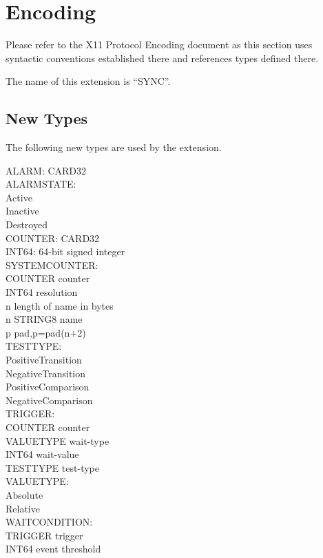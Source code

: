 \section*{Encoding}

Please refer to the X11 Protocol Encoding document as this section uses
syntactic conventions established there and references types defined there.

The name of this extension is ``SYNC''.

\subsection*{New Types}

The following new types are used by the extension.

\begin{tabbing}
\tabstopsC
ALARM: CARD32\\
ALARMSTATE:\\
\tabstopsB
		\> Active \\
		\> Inactive \\
		\> Destroyed\\
\tabstopsC
COUNTER: CARD32\\
INT64: 64-bit signed integer\\
SYSTEMCOUNTER:\\
		\> COUNTER	\> counter \\
		\> INT64	\> resolution\\
		\> n		\> length of name in bytes\\
	\> n	\> STRING8	\> name \\
	\> p	\> 		\> pad,p=pad(n+2)\\
TESTTYPE:\\
\tabstopsB
		\> PositiveTransition \\
		\> NegativeTransition \\
		\> PositiveComparison \\
		\> NegativeComparison \\
\tabstopsC
TRIGGER:\\
		\> COUNTER	\> counter \\
		\> VALUETYPE	\> wait-type \\	
		\> INT64	\> wait-value \\
		\> TESTTYPE	\> test-type \\
VALUETYPE:\\
\tabstopsB
		\> Absolute \\
		\> Relative \\
\tabstopsC
WAITCONDITION:\\
		\> TRIGGER	\> trigger \\
		\> INT64	\> event threshold\\
\end{tabbing}

